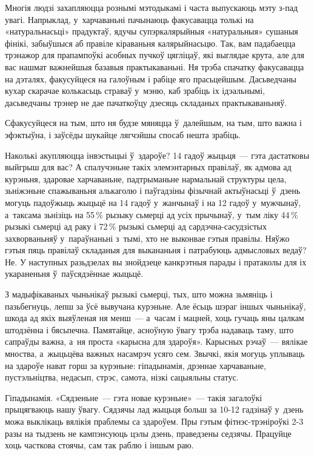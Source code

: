 Многія людзі захапляюцца рознымі мэтодыкамі і часта выпускаюць мэту з-пад увагі. Напрыклад, у~харчаваньні пачынаюць факусавацца толькі на «натуральнасьці» прадуктаў, ядучы супэркалярыйныя «натуральныя» сушаныя фінікі, забыўшыся аб правіле кіраваньня калярыйнасьцю. Так, вам падабаецца трэнажор для прапампоўкі асобных пучкоў цягліцаў, які выглядае крута, але для вас нашмат важнейшыя базавыя практыкаваньні. Ня трэба спачатку факусавацца на дэталях, факусуйцеся на галоўным і рабіце яго прасьцейшым. Дасьведчаны кухар скарачае колькасьць страваў у~мэню, каб зрабіць іх ідэальнымі, дасьведчаны трэнер не дае пачаткоўцу дзесяць складаных практыкаваньняў.

Сфакусуйцеся на тым, што ня будзе мяняцца ў~далейшым, на тым, што важна і эфэктыўна, і заўсёды шукайце лягчэйшы спосаб нешта зрабіць.

Наколькі акупляюцца інвэстыцыі ў~здароўе? 14 гадоў жыцьця~--- гэта дастатковы выйгрыш для вас? А спалучэньне такіх элемэнтарных правілаў, як адмова ад курэньня, здаровае харчаваньне, падтрыманьне нармальнай структуры цела, зьніжэньне спажываньня алькаголю і паўгадзіны фізычнай актыўнасьці ў~дзень могуць падоўжыць жыцьцё на 14 гадоў у~жанчынаў і на 12 гадоў у~мужчынаў, а~таксама зьнізіць на 55\,\% рызыку сьмерці ад усіх прычынаў, у~тым ліку 44\,\% рызыкі сьмерці ад раку і 72\,\% рызыкі сьмерці ад сардэчна-сасудзістых захворваньняў у~параўнаньні з~тымі, хто не выконвае гэтыя правілы. Няўжо гэтыя пяць правілаў складаныя для выкананьня і патрабуюць адмысловых ведаў? Не. У наступных разьдзелах вы знойдзеце канкрэтныя парады і пратаколы для іх укараненьня ў~паўсядзённае жыцьцё.

З мадыфікаваных чыньнікаў рызыкі сьмерці, тых, што можна зьмяніць і пазьбегнуць, лепш за ўсё вывучана курэньне. Але ёсьць шэраг іншых чыньнікаў, шкода ад якіх выяўленая ня менш~--- а~часам і мацней, хоць гучаць яны цалкам штодзённа і бясьпечна. Памятайце, асноўную ўвагу трэба надаваць таму, што сапраўды важна, а~ня проста «карысна для здароўя». Карысных рэчаў~--- вялікае мноства, а~жыцьцёва важных насамрэч усяго сем. Звычкі, якія могуць уплываць на здароўе нават горш за курэньне: гіпадынамія, дрэннае харчаваньне, пустэльніцтва, недасып, стрэс, самота, нізкі сацыяльны статус.

Гіпадынамія. «Сядзеньне~--- гэта новае курэньне»~--- такія загалоўкі прыцягваюць нашу ўвагу. Сядзячы лад жыцьця больш за 10-12 гадзінаў у~дзень можа выклікаць вялікія праблемы са здароўем. Пры гэтым фітнэс-трэніроўкі 2-3 разы на тыдзень не кампэнсуюць цэлы дзень, праведзены седзячы. Працуйце хоць часткова стоячы, сам так раблю і іншым раю.

